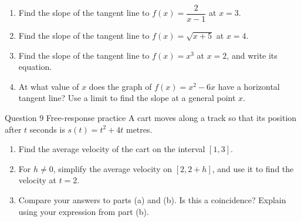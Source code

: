 \documentclass[11pt]{article}
\begin{document}
\begin{enumerate}[leftmargin=*,itemsep=2pt,start=5]
  \item Find the slope of the tangent line to $f(x)=\dfrac{2}{x-1}$ at $x=3$.\work{2.8cm}
  \item Find the slope of the tangent line to $f(x)=\sqrt{x+5}$ at $x=4$.\work{2.8cm}
  \item Find the slope of the tangent line to $f(x)=x^3$ at $x=2$, and write its equation.\work{2.8cm}
  \item At what value of $x$ does the graph of $f(x)=x^2-6x$ have a horizontal tangent line? Use a limit to find the slope at a general point $x$.\work{2.8cm}
\end{enumerate}

\begin{frbox}{Question 9 \textperiodcentered{} Free-response practice}
A cart moves along a track so that its position after $t$ seconds is $s(t)=t^2+4t$ metres.
\begin{enumerate}[label=(\alph*),leftmargin=*,itemsep=2pt]
  \item Find the average velocity of the cart on the interval $[1,3]$.\work{2.6cm}
  \item For $h\neq0$, simplify the average velocity on $[2,2+h]$, and use it to find the velocity at $t=2$.\work{2.6cm}
  \item Compare your answers to parts (a) and (b). Is this a coincidence? Explain using your expression from part (b).\work{2.6cm}
\end{enumerate}
\end{frbox}
\end{document}
